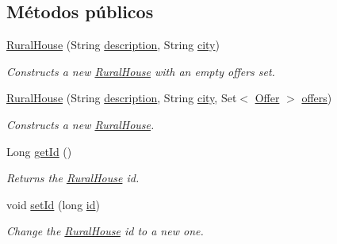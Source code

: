 \subsection*{Métodos públicos}
\begin{DoxyCompactItemize}
\item 
\mbox{\hyperlink{classcom_1_1ruralhousejsf_1_1domain_1_1_rural_house_aa3488a4d0e876307f91f80784a5538a5}{Rural\+House}} (String \mbox{\hyperlink{classcom_1_1ruralhousejsf_1_1domain_1_1_rural_house_a3cd460d3df936008a7c7580e87680fd4}{description}}, String \mbox{\hyperlink{classcom_1_1ruralhousejsf_1_1domain_1_1_rural_house_a495797ff9bd294c83563790e36ec2245}{city}})
\begin{DoxyCompactList}\small\item\em Constructs a new \mbox{\hyperlink{classcom_1_1ruralhousejsf_1_1domain_1_1_rural_house}{Rural\+House}} with an empty offers set. \end{DoxyCompactList}\item 
\mbox{\hyperlink{classcom_1_1ruralhousejsf_1_1domain_1_1_rural_house_a7a4e2da81d0c806e058f446b4c657458}{Rural\+House}} (String \mbox{\hyperlink{classcom_1_1ruralhousejsf_1_1domain_1_1_rural_house_a3cd460d3df936008a7c7580e87680fd4}{description}}, String \mbox{\hyperlink{classcom_1_1ruralhousejsf_1_1domain_1_1_rural_house_a495797ff9bd294c83563790e36ec2245}{city}}, Set$<$ \mbox{\hyperlink{classcom_1_1ruralhousejsf_1_1domain_1_1_offer}{Offer}} $>$ \mbox{\hyperlink{classcom_1_1ruralhousejsf_1_1domain_1_1_rural_house_a8e07bbd638166d5d9356828a4ce09488}{offers}})
\begin{DoxyCompactList}\small\item\em Constructs a new \mbox{\hyperlink{classcom_1_1ruralhousejsf_1_1domain_1_1_rural_house}{Rural\+House}}. \end{DoxyCompactList}\item 
Long \mbox{\hyperlink{classcom_1_1ruralhousejsf_1_1domain_1_1_rural_house_adae53723eac123b55f8122e89cdfe9c3}{get\+Id}} ()
\begin{DoxyCompactList}\small\item\em Returns the \mbox{\hyperlink{classcom_1_1ruralhousejsf_1_1domain_1_1_rural_house}{Rural\+House}} id. \end{DoxyCompactList}\item 
void \mbox{\hyperlink{classcom_1_1ruralhousejsf_1_1domain_1_1_rural_house_aaea8ea8cb5cb886fb0b7e38bb7546472}{set\+Id}} (long \mbox{\hyperlink{classcom_1_1ruralhousejsf_1_1domain_1_1_rural_house_ad9352e84ead5c4feb7eadee60570d9de}{id}})
\begin{DoxyCompactList}\small\item\em Change the \mbox{\hyperlink{classcom_1_1ruralhousejsf_1_1domain_1_1_rural_house}{Rural\+House}} id to a new one. \end{DoxyCompactList}\item 

\end{DoxyCompactItemize}
